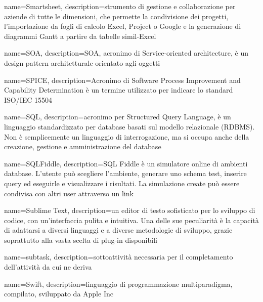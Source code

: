 {
	name=Smartsheet,
	description={strumento di gestione e collaborazione per aziende di tutte le dimensioni, che permette la condivisione dei progetti, l'importazione da fogli di calcolo Excel, Project o Google e la generazione di diagrammi Gantt a partire da tabelle simil-Excel}
}

{
	name=SOA,
	description={SOA, acronimo di Service-oriented architecture, è un design pattern architetturale orientato agli oggetti}
}

{
	name=SPICE,
	description={Acronimo di Software Process Improvement and Capability Determination è un termine utilizzato per indicare lo standard ISO/IEC 15504}
}

{
	name=SQL,
	description={acronimo per Structured Query Language, è un linguaggio standardizzato per database basati sul modello relazionale (RDBMS). Non è semplicemente un linguaggio di interrogazione, ma si occupa anche della creazione, gestione e amministrazione del database}
}

{
	name=SQLFiddle,
	description={SQL Fiddle è un simulatore online di ambienti database. L'utente può scegliere l'ambiente, generare uno schema test, inserire query ed eseguirle e visualizzare i risultati. La simulazione create può essere condivisa con altri user attraverso un link}
}

{
	name=Sublime Text,
	description={un editor di testo sofisticato per lo sviluppo di codice, con un'interfaccia pulita e intuitiva. Una delle sue peculiarit\`{a} \`{e} la capacità di adattarsi a diversi linguaggi e a diverse metodologie di sviluppo, grazie soprattutto alla vasta scelta di plug-in disponibili}
}

{
	name=subtask,
	description={sottoattività necessaria per il completamento dell'attività da cui ne deriva}
}

{
	name=Swift,
	description={linguaggio di programmazione multiparadigma, compilato, sviluppato da Apple Inc}
}
